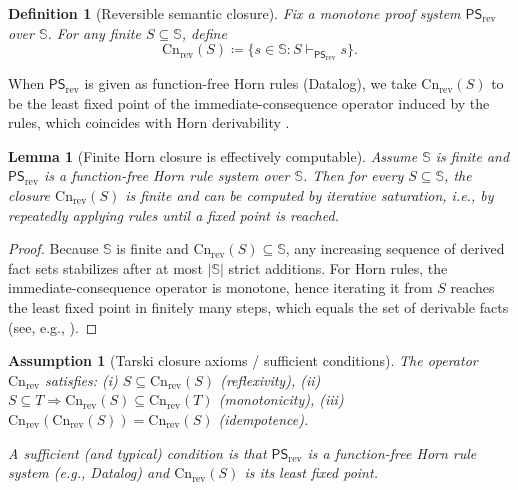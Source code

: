 \documentclass[twoside]{article}
\newtheorem{definition}[theorem]{Definition}
\newtheorem{lemma}[theorem]{Lemma}
\newtheorem{assumption}[theorem]{Assumption}
\newcommand{\Cn}{\mathrm{Cn}}
\newcommand{\1}{\mathbf{1}}
\begin{document}
\begin{definition}[Reversible semantic closure]
\label{def:cn-rev}
Fix a monotone proof system \(\mathsf{PS}_{\mathrm{rev}}\) over \(\mathbb{S}\).
For any finite \(S\subseteq \mathbb{S}\), define
\[
\Cn_{\mathrm{rev}}(S) \coloneqq \{ s\in \mathbb{S} : S \vdash_{\mathsf{PS}_{\mathrm{rev}}} s \}.
\]
\end{definition}

When \(\mathsf{PS}_{\mathrm{rev}}\) is given as function-free Horn rules (Datalog), we take \(\Cn_{\mathrm{rev}}(S)\) to be the least fixed point
of the immediate-consequence operator induced by the rules, which coincides with Horn derivability
\cite{abiteboul1995foundations,dantsin2001complexity}.

\begin{lemma}[Finite Horn closure is effectively computable]
\label{lem:finite-closure-computable}
Assume \(\mathbb{S}\) is finite and \(\mathsf{PS}_{\mathrm{rev}}\) is a function-free Horn rule system over \(\mathbb{S}\).
Then for every \(S\subseteq\mathbb{S}\), the closure \(\Cn_{\mathrm{rev}}(S)\) is finite and can be computed by iterative saturation,
i.e., by repeatedly applying rules until a fixed point is reached.
\end{lemma}

\begin{proof}
Because \(\mathbb{S}\) is finite and \(\Cn_{\mathrm{rev}}(S)\subseteq \mathbb{S}\), any increasing sequence of derived fact sets stabilizes
after at most \(|\mathbb{S}|\) strict additions. For Horn rules, the immediate-consequence operator is monotone, hence iterating it from \(S\)
reaches the least fixed point in finitely many steps, which equals the set of derivable facts (see, e.g., \cite{abiteboul1995foundations,dantsin2001complexity}).
\end{proof}

\begin{assumption}[Tarski closure axioms / sufficient conditions]
\label{assm:tarski}
The operator \(\Cn_{\mathrm{rev}}\) satisfies:
(i) \(S\subseteq \Cn_{\mathrm{rev}}(S)\) (reflexivity),
(ii) \(S\subseteq T \Rightarrow \Cn_{\mathrm{rev}}(S)\subseteq \Cn_{\mathrm{rev}}(T)\) (monotonicity),
(iii) \(\Cn_{\mathrm{rev}}(\Cn_{\mathrm{rev}}(S))=\Cn_{\mathrm{rev}}(S)\) (idempotence).

A sufficient (and typical) condition is that \(\mathsf{PS}_{\mathrm{rev}}\) is a function-free Horn rule system
(e.g., Datalog) and \(\Cn_{\mathrm{rev}}(S)\) is its least fixed point.
\end{assumption}
\end{document}
